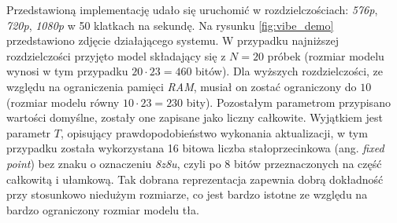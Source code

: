 Przedstawioną implementację udało się uruchomić w rozdzielczościach: \textit{576p}, \textit{720p}, \textit{1080p} w 50 klatkach na sekundę. 
Na rysunku \ref{fig:vibe_demo} przedstawiono zdjęcie działającego systemu. 
W przypadku najniższej rozdzielczości przyjęto model składający się z $N=20$ próbek (rozmiar modelu wynosi w tym przypadku $20 \cdot 23=460$ bitów). 
Dla wyższych rozdzielczości, ze względu na ograniczenia pamięci \textit{RAM}, musiał on zostać ograniczony do $10$ (rozmiar modelu równy $10 \cdot 23=230$ bity). 
Pozostałym parametrom przypisano wartości domyślne, zostały one zapisane jako liczny całkowite. 
Wyjątkiem jest parametr $T$, opisujący prawdopodobieństwo wykonania aktualizacji, w tym przypadku została wykorzystana 16 bitowa liczba stałoprzecinkowa (ang. \textit{fixed point}) bez znaku o oznaczeniu \textit{8z8u}, czyli po 8 bitów przeznaczonych na część całkowitą i ułamkową. Tak dobrana reprezentacja zapewnia dobrą dokładność przy stosunkowo niedużym rozmiarze, co jest bardzo istotne ze względu na bardzo ograniczony rozmiar modelu tła.

